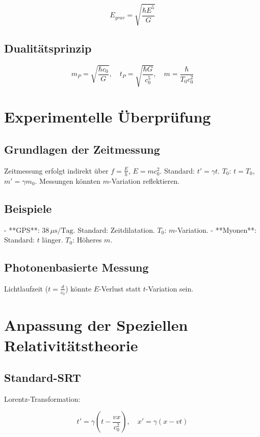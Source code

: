\documentclass{article}
\begin{document}
	\[
	E_{grav} = \sqrt{\frac{\hbar E^5}{G}}
	\]
	
	\subsection{Dualitätsprinzip}
	
	\[
	m_P = \sqrt{\frac{\hbar c_0}{G}}, \quad t_P = \sqrt{\frac{\hbar G}{c_0^5}}, \quad m = \frac{\hbar}{T_0 c_0^2}
	\]
	
	\section{Experimentelle Überprüfung}
	
	\subsection{Grundlagen der Zeitmessung}
	
	Zeitmessung erfolgt indirekt über \( f = \frac{E}{h} \), \( E = m c_0^2 \). Standard: \( t' = \gamma t \). \( T_0 \): \( t = T_0 \), \( m' = \gamma m_0 \). Messungen könnten \( m \)-Variation reflektieren.
	
	\subsection{Beispiele}
	
	- **GPS**: \( 38 \, \mu\text{s/Tag} \). Standard: Zeitdilatation. \( T_0 \): \( m \)-Variation.
	- **Myonen**: Standard: \( t \) länger. \( T_0 \): Höheres \( m \).
	
	\subsection{Photonenbasierte Messung}
	
	Lichtlaufzeit (\( t = \frac{d}{c_0} \)) könnte \( E \)-Verlust statt \( t \)-Variation sein.
	
	\section{Anpassung der Speziellen Relativitätstheorie}
	
	\subsection{Standard-SRT}
	
	Lorentz-Transformation:
	
	\[
	t' = \gamma \left( t - \frac{v x}{c_0^2} \right), \quad x' = \gamma (x - v t)
	\]
	
\end{document}
